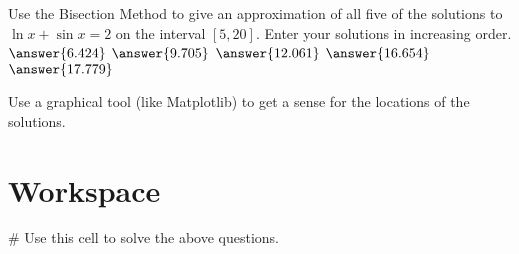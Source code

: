 \documentclass{ximera}
\begin{document}
\begin{question}
	Use the Bisection Method to give an approximation of all five of the solutions to $\ln{x}+\sin{x}=2$ on the interval $[5,20]$. Enter your solutions in increasing order. $\answer{6.424}$ $\answer{9.705}$ $\answer{12.061}$ $\answer{16.654}$ $\answer{17.779}$
	\begin{hint}
		Use a graphical tool (like Matplotlib) to get a sense for the locations of the solutions.
	\end{hint}
\end{question}

\section{Workspace}

\begin{sageCell}
# Use this cell to solve the above questions.
\end{sageCell}
\end{document}
